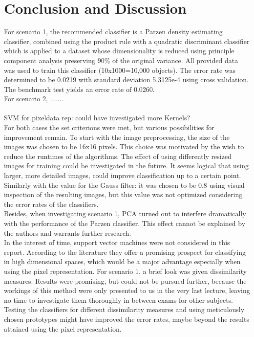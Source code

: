 \section{Conclusion and Discussion}
\label{sec:DiscConcl}

For scenario 1, the recommended classifier is a Parzen density estimating classifier, combined using the product rule with a quadratic discriminant classifier which is applied to a dataset whose dimensionality is reduced using principle component analysis preserving 90\% of the original variance. All provided data was used to train this classifier (10x1000=10,000 objects). The error rate was determined to be 0.0219 with standard deviation 5.3125e-4 using cross validation. The benchmark test yields an error rate of 0.0260.\\
For scenario 2, ....... \\
\\
SVM for pixeldata rep: could have investigated more Kernels?
\\
\noindent For both cases the set criterions were met, but various possibilities for improvement remain. To start with the image preprocessing, the size of the images was chosen to be 16x16 pixels. This choice was motivated by the wish to reduce the runtimes of the algorithms. The effect of using differently resized images for training could be investigated in the future. It seems logical that using larger, more detailed images, could improve classification up to a certain point. Similarly with the value for the Gauss filter: it was chosen to be 0.8 using visual inspection of the resulting images, but this value was not optimized considering the error rates of the classifiers. \\
Besides, when investigating scenario 1, PCA turned out to interfere dramatically with the performance of the Parzen classifier. This effect cannot be explained by the authors and warrants further research. \\
In the interest of time, support vector machines were not considered in this report. According to the literature they offer a promising prospect for classifying in high dimensional spaces, which would be a major advantage especially when using the pixel representation. For scenario 1, a brief look was given dissimilarity measures. Results were promising, but could not be pursued further, because the workings of this method were only presented to us in the very last lecture, leaving no time to investigate them thoroughly in between exams for other subjects. Testing the classifiers for different dissimilarity measures and using meticulously chosen prototypes might have improved the error rates, maybe beyond the results attained using the pixel representation.






